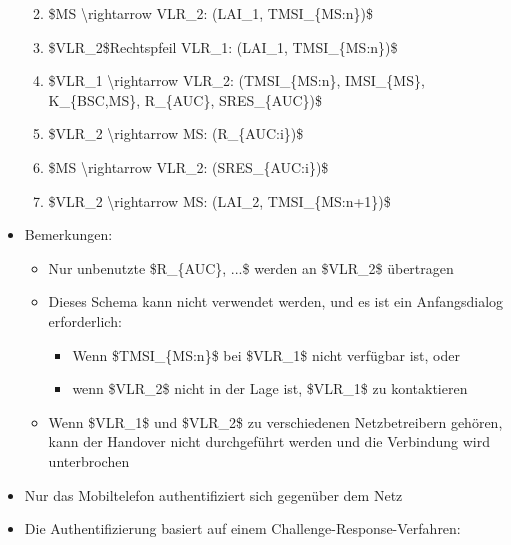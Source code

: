 \documentclass[a4paper]{article}
\begin{document}
\begin{multicols}{3}
\begin{itemize}
              \begin{enumerate}
                  \def\labelenumi{\arabic{enumi}.}
                  \item
                        \$MS \textbackslash rightarrow VLR\_2: (LAI\_1, TMSI\_\{MS:n\})\$
                  \item
                        \$VLR\_2\$Rechtspfeil VLR\_1: (LAI\_1, TMSI\_\{MS:n\})\$
                  \item
                        \$VLR\_1 \textbackslash rightarrow VLR\_2: (TMSI\_\{MS:n\},
                        IMSI\_\{MS\}, K\_\{BSC,MS\}, R\_\{AUC\}, SRES\_\{AUC\})\$
                  \item
                        \$VLR\_2 \textbackslash rightarrow MS: (R\_\{AUC:i\})\$
                  \item
                        \$MS \textbackslash rightarrow VLR\_2: (SRES\_\{AUC:i\})\$
                  \item
                        \$VLR\_2 \textbackslash rightarrow MS: (LAI\_2, TMSI\_\{MS:n+1\})\$
              \end{enumerate}
        \item
              Bemerkungen:

              \begin{itemize}
                  \item
                        Nur unbenutzte \$R\_\{AUC\}, ...\$ werden an \$VLR\_2\$ übertragen
                  \item
                        Dieses Schema kann nicht verwendet werden, und es ist ein
                        Anfangsdialog erforderlich:

                        \begin{itemize}
                            \item
                                  Wenn \$TMSI\_\{MS:n\}\$ bei \$VLR\_1\$ nicht verfügbar ist, oder
                            \item
                                  wenn \$VLR\_2\$ nicht in der Lage ist, \$VLR\_1\$ zu kontaktieren
                        \end{itemize}
                  \item
                        Wenn \$VLR\_1\$ und \$VLR\_2\$ zu verschiedenen Netzbetreibern
                        gehören, kann der Handover nicht durchgeführt werden und die
                        Verbindung wird unterbrochen
              \end{itemize}
        \item
              Nur das Mobiltelefon authentifiziert sich gegenüber dem Netz
        \item
              Die Authentifizierung basiert auf einem Challenge-Response-Verfahren:


\end{itemize}
\end{multicols}
\end{document}
